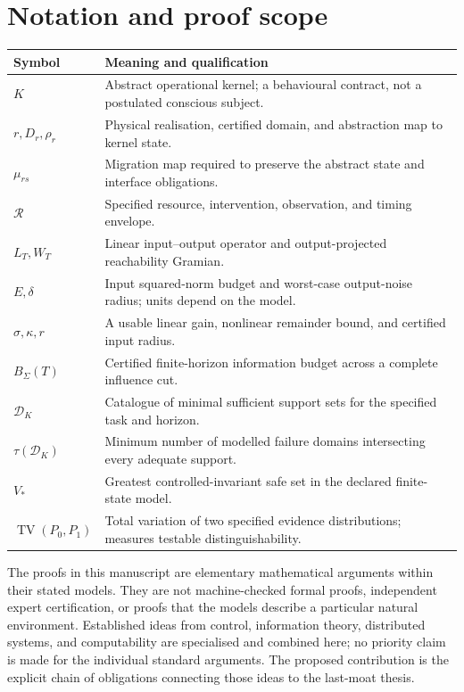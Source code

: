 \documentclass[11pt,a4paper]{article}
\theoremstyle{definition}
\theoremstyle{remark}
\newcommand{\calR}{\mathcal{R}}
\newcommand{\calK}{K}
\DeclareMathOperator{\TV}{TV}
\begin{document}
\section{Notation and proof scope}\label{app:notation}
\begin{longtable}{@{}>{\raggedright\arraybackslash}p{}>{\raggedright\arraybackslash}p{}@{}}
\toprule
Symbol & Meaning and qualification\\
\midrule
\endhead
$\calK$ & Abstract operational kernel; a behavioural contract, not a postulated conscious subject.\\
$r,D_r,\rho_r$ & Physical realisation, certified domain, and abstraction map to kernel state.\\
$\mu_{rs}$ & Migration map required to preserve the abstract state and interface obligations.\\
$\calR$ & Specified resource, intervention, observation, and timing envelope.\\
$L_T,W_T$ & Linear input--output operator and output-projected reachability Gramian.\\
$E,\delta$ & Input squared-norm budget and worst-case output-noise radius; units depend on the model.\\
$\sigma,\kappa,r$ & A usable linear gain, nonlinear remainder bound, and certified input radius.\\
$B_\Sigma(T)$ & Certified finite-horizon information budget across a complete influence cut.\\
$\mathscr D_{\calK}$ & Catalogue of minimal sufficient support sets for the specified task and horizon.\\
$\tau(\mathscr D_{\calK})$ & Minimum number of modelled failure domains intersecting every adequate support.\\
$V_*$ & Greatest controlled-invariant safe set in the declared finite-state model.\\
$\TV(P_0,P_1)$ & Total variation of two specified evidence distributions; measures testable distinguishability.\\
\bottomrule
\end{longtable}

The proofs in this manuscript are elementary mathematical arguments within their stated models. They are not machine-checked formal proofs, independent expert certification, or proofs that the models describe a particular natural environment. Established ideas from control, information theory, distributed systems, and computability are specialised and combined here; no priority claim is made for the individual standard arguments. The proposed contribution is the explicit chain of obligations connecting those ideas to the last-moat thesis.
\end{document}
